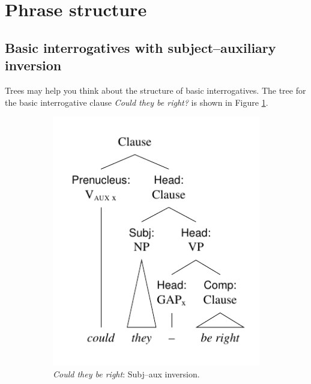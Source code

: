 \section{Phrase structure}\label{sec:phrase-structure}

\subsection{Basic interrogatives with subject--auxiliary inversion}
Trees may help you think about the structure of basic interrogatives. The tree for the basic interrogative clause \textit{Could they be right?} is shown in Figure \ref{fig:tree-theycouldberight}.

\begin{figure}[htb]
  \centering
  \begin{subfigure}[b]{0.48\textwidth}
    \centering
    \includegraphics[width=\textwidth]{figures/couldtheyberight.pdf}
    \caption{\textit{Could they be right}: \textsf{Subj}--aux inversion.}
    \label{fig:tree-theycouldberight}
  \end{subfigure}
  \hfill
  \begin{subfigure}[b]{0.48\textwidth}

\end{subfigure}
\end{figure}
